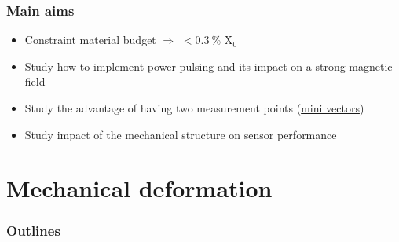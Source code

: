 \documentclass{beamer}
\begin{document}
\begin{frame}
  \frametitle{Main aims}

  \begin{itemize}
    \item Constraint material budget $\Rightarrow$ $< 0.3~\%$ X$_0$
    \item Study how to implement \hyperlink{powerPulsing}{power pulsing} and its impact on a strong magnetic field
    \item Study the advantage of having two measurement points (\hyperlink{miniVec}{mini vectors})
    \item Study impact of the mechanical structure on sensor performance
  \end{itemize}
\end{frame}

  \section{Mechanical deformation}
  
\begin{frame}
    \frametitle{Outlines}
    \tableofcontents[currentsection,hideothersubsections, 
    sectionstyle=show/shaded]
\end{frame}

\end{document}
